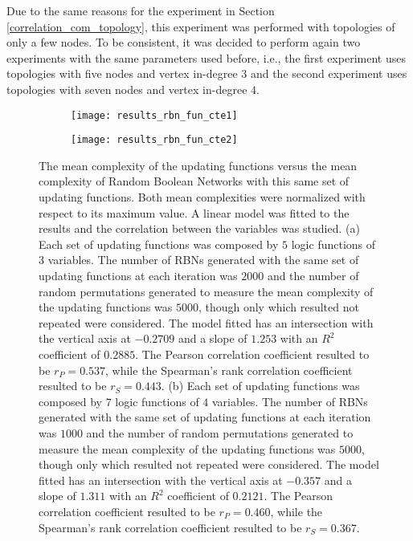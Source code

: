Due to the same reasons for the experiment in Section \ref{correlation_com_topology}, this experiment was performed with topologies of only a few nodes. To be consistent, it was decided to perform again two experiments with the same parameters used before, i.e., the first experiment uses topologies with five nodes and vertex in-degree $3$ and the second experiment uses topologies with seven nodes and vertex in-degree $4$.\\

\begin{figure}
	\centering
	\begin{subfigure}[b]{0.64\textwidth}
		\centering
		\texttt{[image: results\_rbn\_fun\_cte1]}
		\caption{}
		\label{fig:results_rbn_fun_cte1}
	\end{subfigure}
	\hfill
	\begin{subfigure}[b]{0.64\textwidth}
		\centering
		\texttt{[image: results\_rbn\_fun\_cte2]}
		\caption{}
		\label{fig:results_rbn_fun_cte2}
	\end{subfigure}
	\caption[Correlation between the complexity of Random Boolean Networks and its set of updating functions.]{The mean complexity of the updating functions versus the mean complexity of Random Boolean Networks with this same set of updating functions. Both mean complexities were normalized with respect to its maximum value. A linear model was fitted to the results and the correlation between the variables was studied. (a) Each set of updating functions was composed by $5$ logic functions of $3$ variables. The number of RBNs generated with the same set of updating functions at each iteration was $2000$ and the number of random permutations generated to measure the mean complexity of the updating functions was $5000$, though only which resulted not repeated were considered. The model fitted has an intersection with the vertical axis at $-0.2709$ and a slope of $1.253$ with an $R^{2}$ coefficient of $0.2885$. The Pearson correlation coefficient resulted to be $r_{P} =0.537$, while the Spearman's rank correlation coefficient resulted to be $r_{S} =0.443$. (b) Each set of updating functions was composed by $7$ logic functions of $4$ variables. The number of RBNs generated with the same set of updating functions at each iteration was $1000$ and the number of random permutations generated to measure the mean complexity of the updating functions was $5000$, though only which resulted not repeated were considered. The model fitted has an intersection with the vertical axis at $-0.357$ and a slope of $1.311$ with an $R^{2}$ coefficient of $0.2121$. The Pearson correlation coefficient resulted to be $r_{P} =0.460$, while the Spearman's rank correlation coefficient resulted to be $r_{S} =0.367$.}
	\label{fig:results_rbn_fun_cte}
\end{figure}

